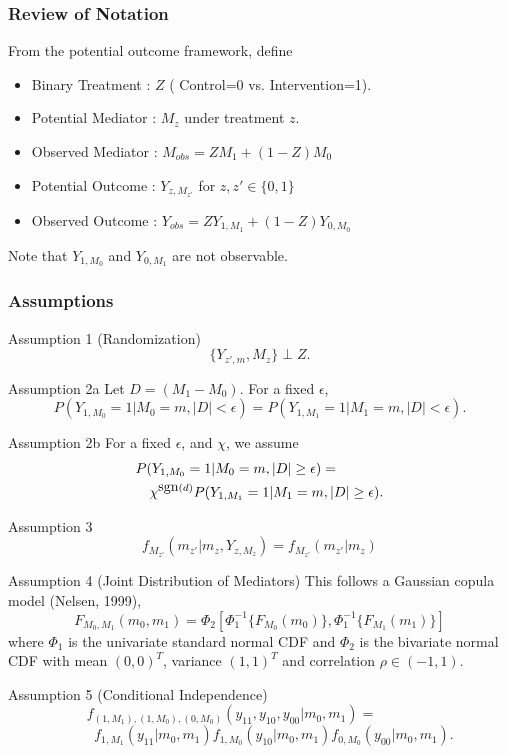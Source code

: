 \documentclass{beamer}
\begin{document}
\begin{frame}
\frametitle{Review of Notation}
From the potential outcome framework, define
\medskip
\begin{itemize}
\item Binary Treatment : $Z$ ( Control=0 vs. Intervention=1).
\medskip
\item Potential Mediator : $M_z$ under treatment $z$. 
\medskip
\item Observed Mediator : $M_{obs} = Z M_1 + (1-Z) M_0$
\medskip
\item Potential Outcome : $Y_{z,M_{z'}}$ for $z,z' \in \{0,1\}$
\medskip
\item Observed Outcome : $Y_{obs} = Z Y_{1,M_1} + (1-Z) Y_{0,M_0}$
\end{itemize}
\medskip
Note that $Y_{1,M_0}$ and $Y_{0,M_1}$ are not observable.
\end{frame}

\begin{frame}
\frametitle{Assumptions}
\begin{block}{Assumption 1 (Randomization)}
\[\{Y_{z',m}, M_z \} \perp Z.\]
\end{block}
\begin{block}{Assumption 2a }
Let $D=(M_1-M_0)$. For a fixed $\epsilon$,
$$P(Y_{1,M_{0}} = 1 | M_{0}=m, |D| < \epsilon) = P(Y_{1,M_{1}} = 1 | M_1=m, |D| < \epsilon).$$
\end{block}
\begin{block}{Assumption 2b }
For a fixed $\epsilon$, and $\chi$, 
we assume 
\begin{eqnarray*}
 \lefteqn{P(Y_{1,M_{0}} = 1 | M_{0}=m, |D| \geq \epsilon) =}\\
 && \chi^{\mbox{sgn}(d)}P(Y_{1,M_{1}} = 1 | M_1=m, |D| \geq \epsilon).
\end{eqnarray*}
\end{block}
\end{frame}
 



\begin{frame}
\begin{block}{Assumption 3}
$$f_{M_{z'}}(m_{z'} | m_{z}, Y_{z,M_z}) = 
f_{M_{z'}}(m_{z'} | m_{z})$$
\end{block}
\begin{block}{Assumption 4 (Joint Distribution of Mediators)}
 This follows a Gaussian copula model (Nelsen, 1999),
\[
F_{M_0, M_1}(m_0,
m_1)=\Phi_2\left[\Phi_1^{-1}\{F_{M_0}(m_0)\},
\Phi_1^{-1}\{F_{M_1}(m_1)\}\right]
\]
\noindent where $\Phi_1$ is the univariate standard normal CDF and $\Phi_2$
is the bivariate normal CDF with mean $(0,0)^T$, variance $(1,1)^T$
and correlation $\rho \in (-1,1)$.  
\end{block}
\begin{block}{Assumption 5 (Conditional Independence)}
 $$f_{(1,M_1),(1,M_0),(0,M_0)}(y_{11}, y_{10}, y_{00}
 |m_0, m_1) = \qquad\qquad$$
 $$\qquad f_{1,M_1}(y_{11}| m_0, m_1)f_{1,M_0}(y_{10} | m_0, m_1)f_{0,M_0}(y_{00} | m_0, m_1).$$
\end{block}
\end{frame}
\end{document}
